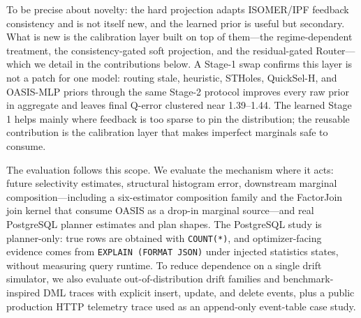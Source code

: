 \documentclass[preprint,12pt]{elsarticle}
\begin{document}
To be precise about novelty: the hard projection adapts ISOMER/IPF feedback
consistency and is not itself new, and the learned prior is useful but secondary.
What is new is the calibration layer built on top of them---the regime-dependent
treatment, the consistency-gated soft projection, and the residual-gated
Router---which we detail in the contributions below. A Stage-1 swap confirms this
layer is not a patch for one model: routing stale, heuristic, STHoles,
QuickSel-H, and OASIS-MLP priors through the same Stage-2 protocol improves every
raw prior in aggregate and leaves final Q-error clustered near 1.39--1.44. The
learned Stage 1 helps mainly where feedback is too sparse to pin the
distribution; the reusable contribution is the calibration layer that makes
imperfect marginals safe to consume.

The evaluation follows this scope. We evaluate the mechanism where it acts:
future selectivity estimates, structural histogram error, downstream marginal
composition---including a six-estimator composition family and the FactorJoin
join kernel that consume OASIS as a drop-in marginal source---and real
PostgreSQL planner estimates and plan shapes. The
PostgreSQL study is planner-only: true rows are obtained with
\texttt{COUNT(*)}, and optimizer-facing evidence comes from
\texttt{EXPLAIN (FORMAT JSON)} under injected statistics states, without
measuring query runtime. To reduce dependence on a single drift simulator, we
also evaluate out-of-distribution drift families and benchmark-inspired DML
traces with explicit insert, update, and delete events, plus a public production
HTTP telemetry trace used as an append-only event-table case study.
\end{document}
